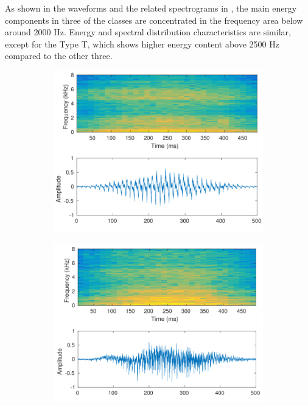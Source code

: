 As shown in the waveforms and the related spectrograms in , the main energy components in three of the classes are concentrated in the frequency area below around 2000 Hz. Energy and spectral distribution characteristics are similar, except for the Type T, which shows higher energy content above 2500 Hz compared to the other three.

\begin{figure}[h]
	\centering
	\begin{subfigure}{.4\textwidth}
		\includegraphics[width=\linewidth]{img/V_spec_crop.pdf}
		\caption{}
		\label{fig:V}
	\end{subfigure}
	\begin{subfigure}{.4\textwidth}
		\includegraphics[width=\linewidth]{img/O_spec_crop.pdf}

\end{subfigure}
\end{figure}

